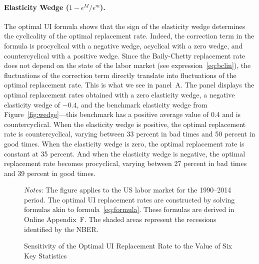\documentclass[letterpaper,12pt,leqno]{article}
\def\path{../}
\newcommand{\fignotes}[1]{\centering\parbox[c]{\textwidth}{\footnotesize \textit{Notes:} #1}}
\def \e{{\epsilon}}
\begin{document}
\paragraph{Elasticity Wedge ($1-\e^{M}/\e^{m}$).} The optimal UI formula shows that the sign of the elasticity wedge determines the cyclicality of the optimal replacement rate. Indeed, the correction term in the formula is procyclical with a negative wedge, acyclical with a zero wedge, and countercyclical with a positive wedge. Since the Baily-Chetty replacement rate does not depend on the state of the labor market (see expression~\eqref{eq:bclin}), the fluctuations of the correction term directly translate into fluctuations of the optimal replacement rate. This is what we see in panel~A. The panel displays the optimal replacement rates obtained with a zero elasticity wedge, a negative elasticity wedge of $-0.4$, and the benchmark elasticity wedge from Figure~\ref{fig:wedge}---this benchmark has a positive average value of 0.4 and is countercyclical. When the elasticity wedge is positive, the optimal replacement rate is countercyclical, varying between 33 percent in bad times and 50 percent in good times. When the elasticity wedge is zero, the optimal replacement rate is constant at 35 percent. And when the elasticity wedge is negative, the optimal replacement rate becomes procyclical, varying between 27 percent in bad times and 39 percent in good times. 

\begin{figure}[p!] \centering
{}\quad
{}
\quad
{}
\quad
{}
\caption{Sensitivity of the Optimal UI Replacement Rate to the Value of Six Key Statistics}
\fignotes{The figure applies to the US labor market for the 1990--2014 period. The optimal UI replacement rates are constructed by solving formulas akin to formula~\eqref{eq:formula}. These formulas are derived in Online Appendix~F. The shaded areas represent the recessions identified by the NBER.}
\label{fig:sensitivity}\end{figure}
\end{document}
